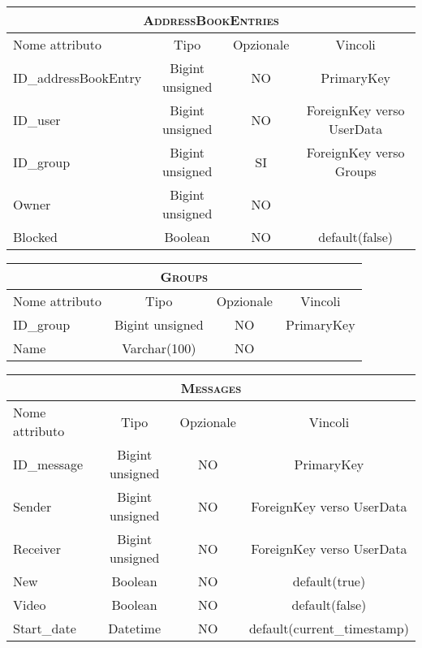 \begin{center}
\bigskip

\begin{tabular}{lccc}
\toprule
\multicolumn{4}{c}{\scshape\bfseries AddressBookEntries}\\
\midrule
Nome attributo & Tipo & Opzionale & Vincoli\\
\midrule
ID\_addressBookEntry & Bigint unsigned & NO & PrimaryKey\\
ID\_user & Bigint unsigned & NO & ForeignKey verso UserData\\
ID\_group & Bigint unsigned & SI & ForeignKey verso Groups\\
Owner & Bigint unsigned & NO & \\
Blocked & Boolean & NO & default(false)\\
\bottomrule
\end{tabular}

\bigskip

\begin{tabular}{lccc}
\toprule
\multicolumn{4}{c}{\scshape\bfseries Groups}\\
\midrule
Nome attributo & Tipo & Opzionale & Vincoli\\
\midrule
ID\_group & Bigint unsigned & NO & PrimaryKey\\
Name & Varchar(100) & NO & \\
\bottomrule
\end{tabular}

\bigskip

\begin{tabular}{lccc}
\toprule
\multicolumn{4}{c}{\scshape\bfseries Messages}\\
\midrule
Nome attributo & Tipo & Opzionale & Vincoli\\
\midrule
ID\_message & Bigint unsigned & NO & PrimaryKey\\
Sender & Bigint unsigned & NO & ForeignKey verso UserData \\
Receiver & Bigint unsigned & NO & ForeignKey verso UserData\\
New & Boolean & NO & default(true)\\
Video & Boolean & NO & default(false)\\
Start\_date & Datetime & NO & default(current\_timestamp)\\
\bottomrule
\end{tabular}

\end{center}

